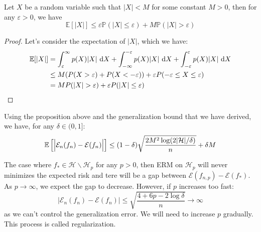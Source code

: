 \begin{proposition}
    Let $X$ be a random variable such that $|X|<M$ for some constant $M>0$, then for any $\varepsilon>0$, we have 
    \begin{equation*}
        \mathbb{E}[|X|] \le \varepsilon\mathbb{P}(|X|\le\varepsilon) + M\mathbb{P}(|X|>\varepsilon)
    \end{equation*}
\end{proposition}
\begin{proof}
    Let's consider the expectation of $|X|$, which we have:
    \begin{equation*}
    \begin{aligned}
        \mathbb{E}[|X|] &= \int^\infty_\varepsilon p(X)|X|\dby X + \int^{-\varepsilon}_{-\infty} p(X)|X|\dby X + \int^\varepsilon_{-\varepsilon} p(X)|X|\dby X  \\
        &\le M(P(X>\varepsilon) + P(X<-\varepsilon)) + \varepsilon P(-\varepsilon\le X \le \varepsilon) \\
        &= MP(|X|>\varepsilon) + \varepsilon P(|X|\le\varepsilon)
    \end{aligned}
    \end{equation*}
\end{proof}
\begin{corollary}
    Using the proposition above and the generalization bound that we have derived, we have, for any $\delta\in(0, 1]$:
    \begin{equation*}
        \mathbb{E}\left[ \Big| \mathcal{E}_n(f_n) - \mathcal{E}(f_n) \Big| \right] \le (1-\delta)\sqrt{\frac{2M^2\log(2|\mathcal{H}|/\delta)}{n}} + \delta M
    \end{equation*}
\end{corollary}

\begin{remark}
    \label{remark:first-reg}
    The case where $f_*\in \mathcal{H}\backslash\mathcal{H}_p$ for any $p>0$, then ERM on $\mathcal{H}_p$ will never minimizes the expected risk and tere will be a gap between $\mathcal{E}(f_{n,p}) - \mathcal{E}(f_*)$. As $p\rightarrow\infty$, we expect the gap to decrease. However, if $p$ increases too fast:
    \begin{equation*}
        \Big| \mathcal{E}_n(f_n) - \mathcal{E}(f_n) \Big| \le \sqrt{\frac{4 + 6p-2\log\delta}{n}} \rightarrow\infty
    \end{equation*}
    as we can't control the generalization error. We will need to increase $p$ gradually. This process is called regularization.
\end{remark}

